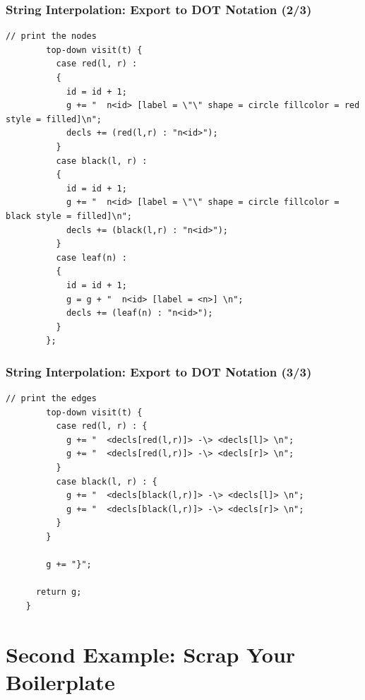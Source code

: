 \documentclass{beamer}
\begin{document}
\begin{frame}[fragile]
  \frametitle{String Interpolation: Export to DOT Notation (2/3)}

  \begin{small}
    \begin{lstlisting}[language=Rascal]
        // print the nodes
        top-down visit(t) {
          case red(l, r) :
          {
            id = id + 1;
            g += "  n<id> [label = \"\" shape = circle fillcolor = red style = filled]\n";
            decls += (red(l,r) : "n<id>");
          }
          case black(l, r) :
          {
            id = id + 1;
            g += "  n<id> [label = \"\" shape = circle fillcolor = black style = filled]\n";
            decls += (black(l,r) : "n<id>");
          }
          case leaf(n) :
          {
            id = id + 1;
            g = g + "  n<id> [label = <n>] \n";
            decls += (leaf(n) : "n<id>");
          }
        };
\end{lstlisting}
  \end{small}
\end{frame}

\begin{frame}[fragile]
  \frametitle{String Interpolation: Export to DOT Notation (3/3)}
  \begin{small}
    \begin{lstlisting}[language=Rascal]
        // print the edges
        top-down visit(t) {
          case red(l, r) : {
            g += "  <decls[red(l,r)]> -\> <decls[l]> \n";
            g += "  <decls[red(l,r)]> -\> <decls[r]> \n";
          }
          case black(l, r) : {
            g += "  <decls[black(l,r)]> -\> <decls[l]> \n";
            g += "  <decls[black(l,r)]> -\> <decls[r]> \n";
          }
        }

        g += "}";

      return g;
    }
  \end{lstlisting}  
  \end{small}  
\end{frame}

\section{Second Example: Scrap Your Boilerplate}
\end{document}
